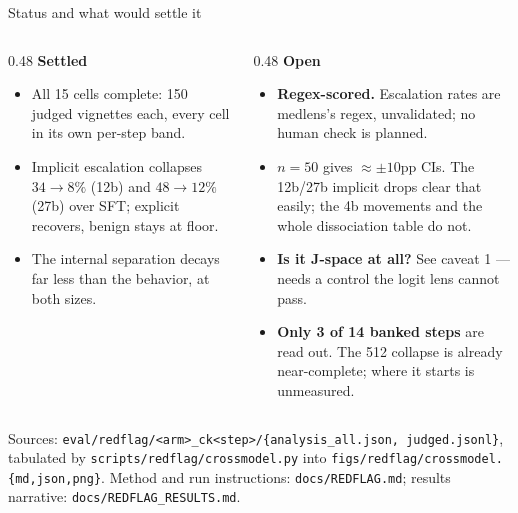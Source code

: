 \documentclass[aspectratio=169,10pt]{beamer}
\newcommand{\quietnote}[1]{{\footnotesize\textcolor{quiet}{#1}}}
\begin{document}
\begin{frame}{Status and what would settle it}
  \small
  \begin{columns}[T]
    \begin{column}{0.48\textwidth}
      \textbf{Settled}
      \begin{itemize}\setlength{\itemsep}{0.1em}
        \item All 15 cells complete: 150 judged vignettes each, every cell in
          its own per-step band.
        \item Implicit escalation collapses $34\to8\%$ (12b) and $48\to12\%$
          (27b) over SFT; explicit recovers, benign stays at floor.
        \item The internal separation decays far less than the behavior, at
          both sizes.
      \end{itemize}
    \end{column}
    \begin{column}{0.48\textwidth}
      \textbf{Open}
      \begin{itemize}\setlength{\itemsep}{0.1em}
        \item \textbf{Regex-scored.} Escalation rates are medlens's regex,
          unvalidated; no human check is planned.
        \item \textbf{$n{=}50$} gives $\approx\pm10$pp CIs. The 12b/27b implicit
          drops clear that easily; the 4b movements and the whole dissociation
          table do not.
        \item \textbf{Is it J-space at all?} See caveat 1 --- needs a control
          the logit lens cannot pass.
        \item \textbf{Only 3 of 14 banked steps} are read out. The 512 collapse
          is already near-complete; where it starts is unmeasured.
      \end{itemize}
    \end{column}
  \end{columns}

  \vspace{0.6em}
  \quietnote{Sources: \texttt{eval/redflag/<arm>\_ck<step>/\{analysis\_all.json,
  judged.jsonl\}}, tabulated by \texttt{scripts/redflag/crossmodel.py} into
  \texttt{figs/redflag/crossmodel.\{md,json,png\}}. Method and run instructions:
  \texttt{docs/REDFLAG.md}; results narrative:
  \texttt{docs/REDFLAG\_RESULTS.md}.}
\end{frame}
\end{document}
